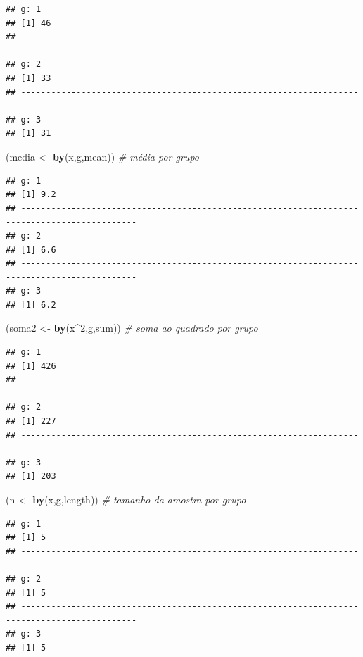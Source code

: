 \documentclass[
]{book}
\newenvironment{Shaded}{\begin{snugshade}}{\end{snugshade}}
\newcommand{\CommentTok}[1]{\textcolor[rgb]{0.56,0.35,0.01}{\textit{#1}}}
\newcommand{\DecValTok}[1]{\textcolor[rgb]{0.00,0.00,0.81}{#1}}
\newcommand{\KeywordTok}[1]{\textcolor[rgb]{0.13,0.29,0.53}{\textbf{#1}}}
\newcommand{\NormalTok}[1]{#1}
\newcommand{\OperatorTok}[1]{\textcolor[rgb]{0.81,0.36,0.00}{\textbf{#1}}}
\newcommand{\StringTok}[1]{\textcolor[rgb]{0.31,0.60,0.02}{#1}}
\theoremstyle{definition}
\theoremstyle{definition}
\theoremstyle{definition}
\theoremstyle{remark}
\begin{document}
\begin{verbatim}
## g: 1
## [1] 46
## --------------------------------------------------------------------------------------------- 
## g: 2
## [1] 33
## --------------------------------------------------------------------------------------------- 
## g: 3
## [1] 31
\end{verbatim}

\begin{Shaded}
\begin{Highlighting}[]
\NormalTok{(media \textless{}{-}}\StringTok{ }\KeywordTok{by}\NormalTok{(x,g,mean))   }\CommentTok{\# média por grupo}
\end{Highlighting}
\end{Shaded}

\begin{verbatim}
## g: 1
## [1] 9.2
## --------------------------------------------------------------------------------------------- 
## g: 2
## [1] 6.6
## --------------------------------------------------------------------------------------------- 
## g: 3
## [1] 6.2
\end{verbatim}

\begin{Shaded}
\begin{Highlighting}[]
\NormalTok{(soma2 \textless{}{-}}\StringTok{ }\KeywordTok{by}\NormalTok{(x}\OperatorTok{\^{}}\DecValTok{2}\NormalTok{,g,sum))  }\CommentTok{\# soma ao quadrado por grupo}
\end{Highlighting}
\end{Shaded}

\begin{verbatim}
## g: 1
## [1] 426
## --------------------------------------------------------------------------------------------- 
## g: 2
## [1] 227
## --------------------------------------------------------------------------------------------- 
## g: 3
## [1] 203
\end{verbatim}

\begin{Shaded}
\begin{Highlighting}[]
\NormalTok{(n \textless{}{-}}\StringTok{ }\KeywordTok{by}\NormalTok{(x,g,length))     }\CommentTok{\# tamanho da amostra por grupo}
\end{Highlighting}
\end{Shaded}

\begin{verbatim}
## g: 1
## [1] 5
## --------------------------------------------------------------------------------------------- 
## g: 2
## [1] 5
## --------------------------------------------------------------------------------------------- 
## g: 3
## [1] 5
\end{verbatim}
\end{document}

